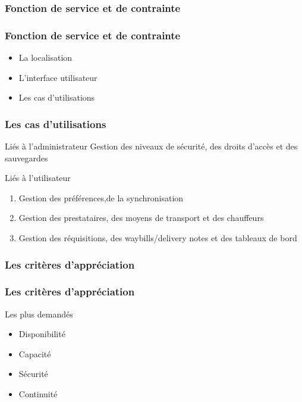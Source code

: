 \subsubsection{Fonction de service et de contrainte}
\begin{frame}
  \frametitle{Fonction de service et de contrainte}
  \begin{block}{}
  \begin{itemize}
  \item La localisation \pause
  \item L'interface utilisateur \pause
  \item Les cas d'utilisations
  \end{itemize}
  \end{block}
\end{frame}

\begin{frame}
\frametitle{Les cas d'utilisations} \pause
\begin{block}{Liés à l'administrateur}
Gestion des niveaux de sécurité, des droits d'accès et des sauvegardes
\end{block}
\pause
\begin{block}{Liés à l'utilisateur}
\begin{enumerate}
\item Gestion des préférences,de la synchronisation \pause
\item Gestion des prestataires, des moyens de transport et des chauffeurs \pause
\item Gestion des réquisitions, des waybills/delivery notes et des tableaux de bord
\end{enumerate}
\end{block}
\end{frame}

\subsubsection{Les critères d'appréciation}
\begin{frame}
  \frametitle{Les critères d'appréciation}
  \begin{block}{Les plus demandés}
  \begin{itemize}
  \item Disponibilité \pause
  \item Capacité \pause
  \item Sécurité \pause
  \item Continuité 
  \end{itemize}
  \end{block}
  \end{frame}